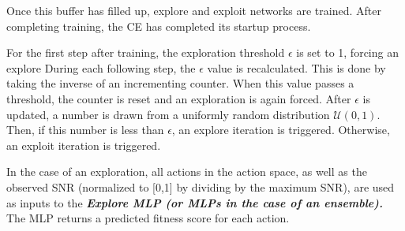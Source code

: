 \par Once this buffer has filled up, explore and exploit networks are trained. After completing training, the CE has completed its startup process. 
\par For the first step after training, the exploration threshold $\epsilon$ is set to 1, forcing an explore During each following step, the $\epsilon$ value is recalculated. This is done by taking the inverse of an incrementing counter. When this value passes a threshold, the counter is reset and an exploration is again forced. After $\epsilon$ is updated, a number is drawn from a uniformly random distribution $\mathcal{U}(0,1)$. Then, if this number is less than $\epsilon$, an explore iteration is triggered. Otherwise, an exploit iteration is triggered.
\par In the case of an exploration, all actions in the action space, as well as the observed SNR (normalized to [0,1] by dividing by the maximum SNR), are used as inputs to the \textit{\textbf{Explore MLP (or MLPs in the case of an ensemble).}} The MLP returns a predicted fitness score for each action. 

